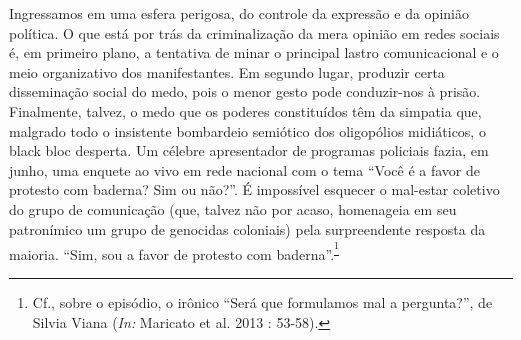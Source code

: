 Ingressamos em uma esfera perigosa, do controle da expressão e da
opinião política. O que está por trás da criminalização da mera opinião
em redes sociais é, em primeiro plano, a tentativa de minar o principal
lastro comunicacional e o meio organizativo dos manifestantes. Em
segundo lugar, produzir certa disseminação social do medo, pois o menor
gesto pode conduzir-nos à prisão. Finalmente, talvez, o medo que os
poderes constituídos têm da simpatia que, malgrado todo o insistente
bombardeio semiótico dos oligopólios midiáticos, o black bloc desperta.
Um célebre apresentador de programas policiais fazia, em junho, uma
enquete ao vivo em rede nacional com o tema ``Você é a favor de protesto
com baderna? Sim ou não?''. É impossível esquecer o mal-estar coletivo
do grupo de comunicação (que, talvez não por acaso, homenageia em seu
patronímico um grupo de genocidas coloniais) pela surpreendente resposta
da maioria. ``Sim, sou a favor de protesto com
baderna''.\textsuperscript{\footnote{Cf., sobre o episódio, o irônico
  ``Será que formulamos mal a pergunta?'', de Silvia Viana (\emph{In:}
  Maricato et al. 2013 : 53-58).}}

